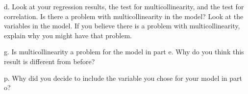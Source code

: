 \begin{description} %
	\item{d.} Look at your regression results, the test for multicollinearity, and the test for correlation. Is there a problem with multicollinearity in the model? Look at the variables in the model. If you believe there is a problem with multicollinearity, explain why you might have that problem.
	\item{g.} Is multicollinearity a problem for the model in part e. Why do you think this result is different from before?
	\item{p.} Why did you decide to include the variable you chose for your model in part o?
\end{description}